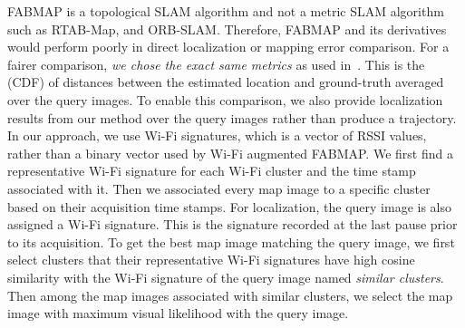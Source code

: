 FABMAP is a topological SLAM algorithm and not a metric SLAM algorithm such as RTAB-Map, and ORB-SLAM. Therefore, FABMAP and its derivatives would perform poorly in direct localization or mapping error comparison. For a fairer comparison, {\it we chose the exact same metrics} as used in~\cite{visual_wifi_2}. 
This is the (CDF) of distances between the estimated location and ground-truth averaged over the query images. To enable this comparison, we also provide localization results from our method over the query images rather than produce a trajectory.
In our approach, we use Wi-Fi signatures, which is a vector of RSSI values, rather than a binary vector used by Wi-Fi augmented FABMAP. We first find a representative Wi-Fi signature for each Wi-Fi cluster and the time stamp associated with it. %
Then we associated every map image to a specific cluster based on their acquisition time stamps. For localization, the query image is also assigned a Wi-Fi signature. This is the signature recorded at the last pause prior to its acquisition. 
To get the best map image matching the query image, we first select clusters that their representative Wi-Fi signatures have high cosine similarity with the Wi-Fi signature of the query image named {\it similar clusters}. Then among the map images associated with similar clusters, we select the map image with maximum visual likelihood with the query image.%

